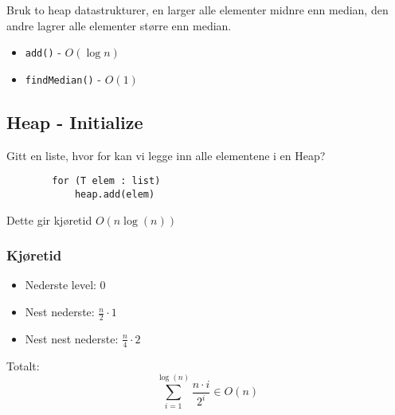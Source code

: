\documentclass{article}
\begin{document}
    Bruk to heap datastrukturer, en larger alle elementer midnre enn median, den andre lagrer alle elementer større enn median.

    \begin{itemize}
        \item \texttt{add()} - \( O\left( \log n \right) \)
        \item \texttt{findMedian()} - \( O\left( 1 \right) \)
    \end{itemize}

    \subsection{Heap - Initialize}
    Gitt en liste, hvor for kan vi legge inn alle elementene i en Heap?

    \begin{lstlisting}
        for (T elem : list)
            heap.add(elem) 
    \end{lstlisting}

    Dette gir kjøretid \( O\left( n \log \left(  n \right) \right) \)

    \subsubsection{Kjøretid}

    \begin{itemize}
        \item Nederste level: 0 
        \item Nest nederste: \( \frac{n}{2} \cdot 1 \)
        \item Nest nest nederste: \( \frac{n}{4} \cdot  2  \)
    \end{itemize}

    Totalt:
    \[ \sum_{i=1}^{\log\left( n \right)} \frac{n \cdot i}{2^{i}} \in O\left( n \right) \]
\end{document}
